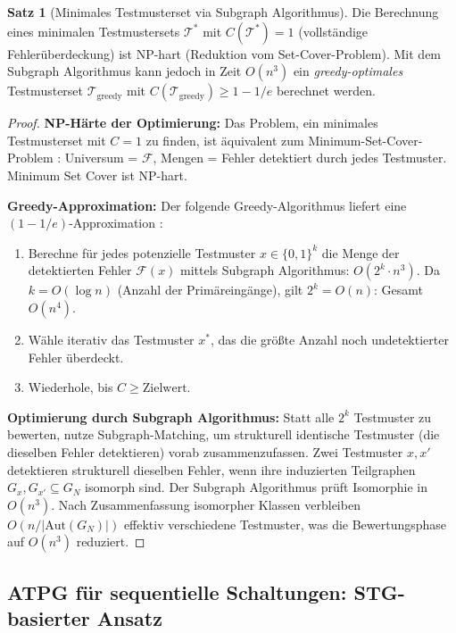 ﻿\documentclass[a4paper,12pt]{article}
\theoremstyle{definition}
\newtheorem{satz}{Satz}
\begin{document}
\begin{satz}[Minimales Testmusterset via Subgraph Algorithmus]\label{satz:mintest}
  Die Berechnung eines minimalen Testmustersets $\mathcal{T}^*$ mit
  $C(\mathcal{T}^*) = 1$ (vollständige Fehlerüberdeckung) ist NP-hart
  \cite{garey1979computers} (Reduktion vom Set-Cover-Problem). Mit dem Subgraph
  Algorithmus kann jedoch in Zeit $O(n^3)$ ein \emph{greedy-optimales} Testmusterset
  $\mathcal{T}_{\text{greedy}}$ mit $C(\mathcal{T}_{\text{greedy}}) \geq 1 - 1/e$
  berechnet werden.
\end{satz}

\begin{proof}
  \textbf{NP-Härte der Optimierung:} Das Problem, ein minimales Testmusterset mit
  $C = 1$ zu finden, ist äquivalent zum Minimum-Set-Cover-Problem
  \cite{garey1979computers}: Universum = $\mathcal{F}$, Mengen = Fehler detektiert
  durch jedes Testmuster. Minimum Set Cover ist NP-hart.

  \textbf{Greedy-Approximation:} Der folgende Greedy-Algorithmus liefert eine
  $(1-1/e)$-Approximation \cite{cormen2022}:
  \begin{enumerate}
    \item Berechne für jedes potenzielle Testmuster $x \in \{0,1\}^k$ die Menge
          der detektierten Fehler $\mathcal{F}(x)$ mittels Subgraph Algorithmus:
          $O(2^k \cdot n^3)$. Da $k = O(\log n)$ (Anzahl der Primäreingänge), gilt
          $2^k = O(n)$: Gesamt $O(n^4)$.
    \item Wähle iterativ das Testmuster $x^*$, das die größte Anzahl noch
          undetektierter Fehler überdeckt.
    \item Wiederhole, bis $C \geq \text{Zielwert}$.
  \end{enumerate}

  \textbf{Optimierung durch Subgraph Algorithmus:} Statt alle $2^k$ Testmuster
  zu bewerten, nutze Subgraph-Matching, um strukturell identische Testmuster
  (die dieselben Fehler detektieren) vorab zusammenzufassen. Zwei Testmuster $x, x'$
  detektieren strukturell dieselben Fehler, wenn ihre induzierten Teilgraphen
  $G_{x}, G_{x'} \subseteq G_N$ isomorph sind. Der Subgraph Algorithmus prüft Isomorphie
  in $O(n^3)$. Nach Zusammenfassung isomorpher Klassen verbleiben $O(n / |\text{Aut}(G_N)|)$
  effektiv verschiedene Testmuster, was die Bewertungsphase auf $O(n^3)$ reduziert.
\end{proof}

\subsection{ATPG für sequentielle Schaltungen: STG-basierter Ansatz}
\end{document}
